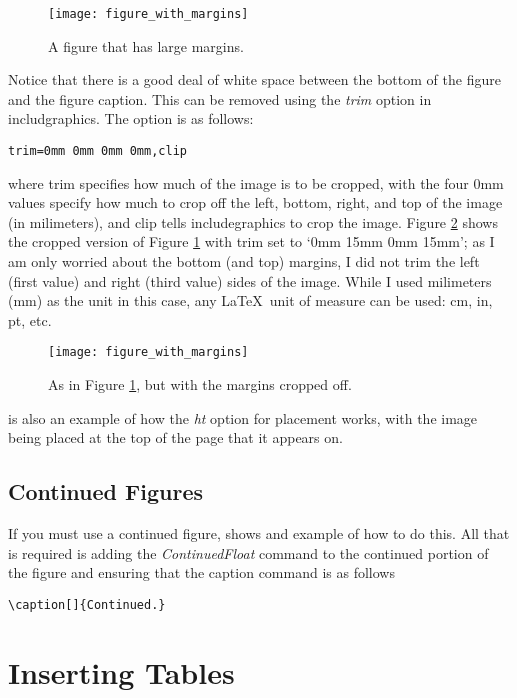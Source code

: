 \begin{figure}[ht]
  \centering
  \texttt{[image: figure\_with\_margins]}
  \caption{A figure that has large margins.}
  \label{fig:large_margins}
\end{figure}

Notice that there is a good deal of white space between the bottom of the figure and the figure caption. This can be removed using the {\it trim} option in includgraphics. The option is as follows:
\begin{verbatim}
trim=0mm 0mm 0mm 0mm,clip
\end{verbatim}
where trim specifies how much of the image is to be cropped, with the four 0mm values specify how much to crop off the left, bottom, right, and top of the image (in milimeters), and clip tells includegraphics to crop the image. Figure \ref{fig:cropped_image} shows the cropped version of Figure \ref{fig:large_margins} with trim set to `0mm 15mm 0mm 15mm'; as I am only worried about the bottom (and top) margins, I did not trim the left (first value) and right (third value) sides of the image. While I used milimeters (mm) as the unit in this case, any \LaTeX\ unit of measure can be used: cm, in, pt, etc.

\begin{figure}[ht]
  \centering
  \texttt{[image: figure\_with\_margins]}
  \caption{As in Figure \ref{fig:large_margins}, but with the margins cropped off.}
  \label{fig:cropped_image}
\end{figure}

 is also an example of how the {\it ht} option for placement works, with the image being placed at the top of the page that it appears on.

\subsection{Continued Figures}
If you must use a continued figure,  shows and example of how to do this. All that is required is adding the {\it ContinuedFloat} command to the continued portion of the figure and ensuring that the caption command is as follows
\begin{verbatim}
\caption[]{Continued.}
\end{verbatim}


\newpage%
\section{Inserting Tables}


